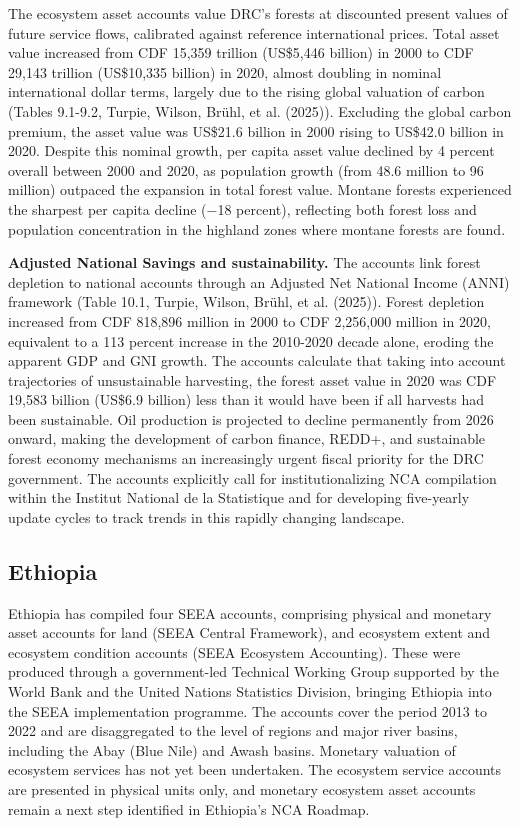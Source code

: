 \documentclass[
  letterpaper,
  DIV=11,
  numbers=noendperiod]{scrartcl}
\begin{document}
The ecosystem asset accounts value DRC's forests at discounted present
values of future service flows, calibrated against reference
international prices. Total asset value increased from CDF 15,359
trillion (US\$5,446 billion) in 2000 to CDF 29,143 trillion (US\$10,335
billion) in 2020, almost doubling in nominal international dollar terms,
largely due to the rising global valuation of carbon (Tables 9.1-9.2,
Turpie, Wilson, Brühl, et al. (2025)). Excluding the global carbon
premium, the asset value was US\$21.6 billion in 2000 rising to US\$42.0
billion in 2020. Despite this nominal growth, per capita asset value
declined by 4 percent overall between 2000 and 2020, as population
growth (from 48.6 million to 96 million) outpaced the expansion in total
forest value. Montane forests experienced the sharpest per capita
decline (−18 percent), reflecting both forest loss and population
concentration in the highland zones where montane forests are found.

\textbf{Adjusted National Savings and sustainability.} The accounts link
forest depletion to national accounts through an Adjusted Net National
Income (ANNI) framework (Table 10.1, Turpie, Wilson, Brühl, et al.
(2025)). Forest depletion increased from CDF 818,896 million in 2000 to
CDF 2,256,000 million in 2020, equivalent to a 113 percent increase in
the 2010-2020 decade alone, eroding the apparent GDP and GNI growth. The
accounts calculate that taking into account trajectories of
unsustainable harvesting, the forest asset value in 2020 was CDF 19,583
billion (US\$6.9 billion) less than it would have been if all harvests
had been sustainable. Oil production is projected to decline permanently
from 2026 onward, making the development of carbon finance, REDD+, and
sustainable forest economy mechanisms an increasingly urgent fiscal
priority for the DRC government. The accounts explicitly call for
institutionalizing NCA compilation within the Institut National de la
Statistique and for developing five-yearly update cycles to track trends
in this rapidly changing landscape.

\subsection{Ethiopia}\label{ethiopia}

Ethiopia has compiled four SEEA accounts, comprising physical and
monetary asset accounts for land (SEEA Central Framework), and ecosystem
extent and ecosystem condition accounts (SEEA Ecosystem Accounting).
These were produced through a government-led Technical Working Group
supported by the World Bank and the United Nations Statistics Division,
bringing Ethiopia into the SEEA implementation programme. The accounts
cover the period 2013 to 2022 and are disaggregated to the level of
regions and major river basins, including the Abay (Blue Nile) and Awash
basins. Monetary valuation of ecosystem services has not yet been
undertaken. The ecosystem service accounts are presented in physical
units only, and monetary ecosystem asset accounts remain a next step
identified in Ethiopia's NCA Roadmap.
\end{document}
